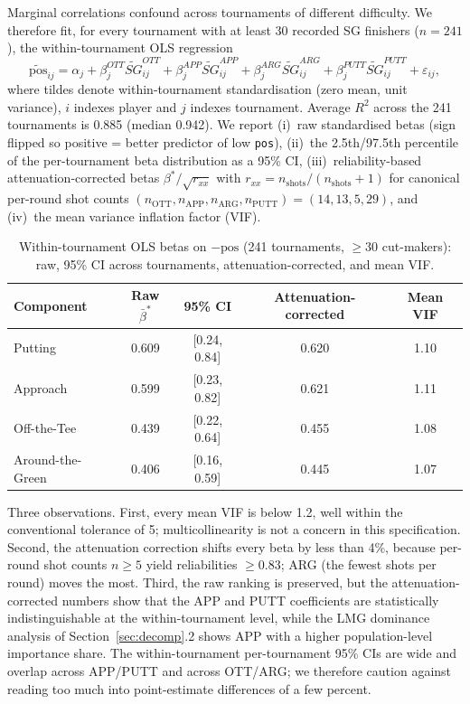 \documentclass[11pt]{article}
\begin{document}
Marginal correlations confound across tournaments of different difficulty.  We therefore fit, for every tournament with at least 30 recorded SG finishers ($n=241$), the within-tournament OLS regression
\begin{equation}
\label{eq:within}
\widetilde{\text{pos}}_{ij} = \alpha_j + \beta^{OTT}_j \widetilde{SG}^{OTT}_{ij} + \beta^{APP}_j \widetilde{SG}^{APP}_{ij} + \beta^{ARG}_j \widetilde{SG}^{ARG}_{ij} + \beta^{PUTT}_j \widetilde{SG}^{PUTT}_{ij} + \varepsilon_{ij},
\end{equation}
where tildes denote within-tournament standardisation (zero mean, unit variance), $i$ indexes player and $j$ indexes tournament.  Average $R^2$ across the 241 tournaments is 0.885 (median 0.942).  We report (i)~raw standardised betas (sign flipped so positive = better predictor of low \texttt{pos}), (ii)~the 2.5th/97.5th percentile of the per-tournament beta distribution as a 95\% CI, (iii)~reliability-based attenuation-corrected betas \citep{hunter1990methods} $\beta^*/\sqrt{r_{xx}}$ with $r_{xx} = n_\text{shots}/(n_\text{shots}+1)$ for canonical per-round shot counts $(n_\text{OTT}, n_\text{APP}, n_\text{ARG}, n_\text{PUTT}) = (14, 13, 5, 29)$, and (iv)~the mean variance inflation factor (VIF).

\begin{table}[t]
\centering
\small
\caption{Within-tournament OLS betas on $-\text{pos}$ (241 tournaments, $\ge30$ cut-makers): raw, 95\% CI across tournaments, attenuation-corrected, and mean VIF.}
\label{tab:within}
\begin{tabular}{lcccc}
\toprule
Component & Raw $\bar\beta^*$ & 95\% CI & Attenuation-corrected & Mean VIF \\
\midrule
Putting           & 0.609 & [0.24, 0.84] & 0.620 & 1.10 \\
Approach          & 0.599 & [0.23, 0.82] & 0.621 & 1.11 \\
Off-the-Tee       & 0.439 & [0.22, 0.64] & 0.455 & 1.08 \\
Around-the-Green  & 0.406 & [0.16, 0.59] & 0.445 & 1.07 \\
\bottomrule
\end{tabular}
\end{table}

Three observations.  First, every mean VIF is below 1.2, well within the conventional tolerance of 5; multicollinearity is not a concern in this specification.  Second, the attenuation correction shifts every beta by less than 4\%, because per-round shot counts $n \ge 5$ yield reliabilities $\ge 0.83$; ARG (the fewest shots per round) moves the most.  Third, the raw ranking is preserved, but the attenuation-corrected numbers show that the APP and PUTT coefficients are statistically indistinguishable at the within-tournament level, while the LMG dominance analysis of Section~\ref{sec:decomp}.2 shows APP with a higher population-level importance share.  The within-tournament per-tournament 95\% CIs are wide and overlap across APP/PUTT and across OTT/ARG; we therefore caution against reading too much into point-estimate differences of a few percent.
\end{document}
